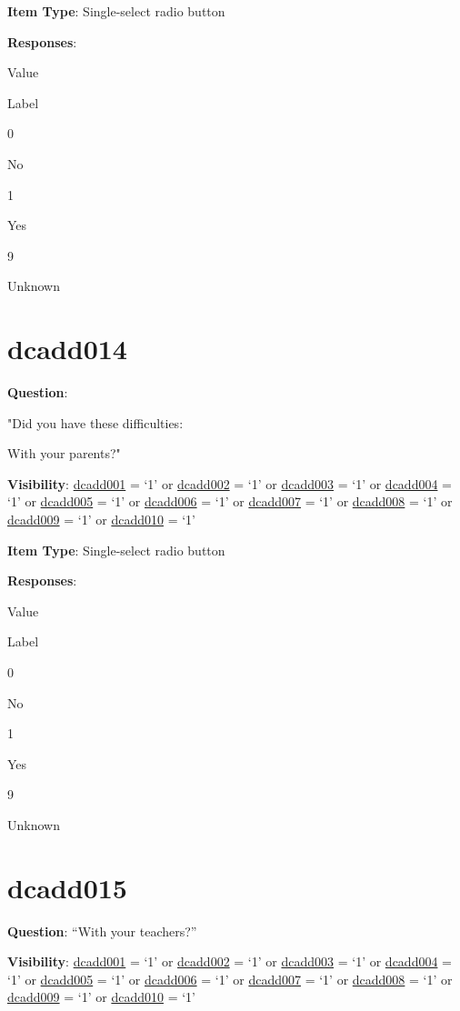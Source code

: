 \documentclass[]{book}
\begin{document}
\textbf{Item Type}: Single-select radio button

\textbf{Responses}:

Value

Label

0

No

1

Yes

9

Unknown

\hypertarget{dcadd014}{%
\section{dcadd014}\label{dcadd014}}

\textbf{Question}:

"Did you have these difficulties:

With your parents?"

\textbf{Visibility}: \protect\hyperlink{dcadd001}{dcadd001} = `1' or \protect\hyperlink{dcadd002}{dcadd002} = `1' or \protect\hyperlink{dcadd003}{dcadd003} = `1' or \protect\hyperlink{dcadd004}{dcadd004} = `1' or \protect\hyperlink{dcadd005}{dcadd005} = `1' or \protect\hyperlink{dcadd006}{dcadd006} = `1' or \protect\hyperlink{dcadd007}{dcadd007} = `1' or \protect\hyperlink{dcadd008}{dcadd008} = `1' or \protect\hyperlink{dcadd009}{dcadd009} = `1' or \protect\hyperlink{dcadd010}{dcadd010} = `1'

\textbf{Item Type}: Single-select radio button

\textbf{Responses}:

Value

Label

0

No

1

Yes

9

Unknown

\hypertarget{dcadd015}{%
\section{dcadd015}\label{dcadd015}}

\textbf{Question}: ``With your teachers?''

\textbf{Visibility}: \protect\hyperlink{dcadd001}{dcadd001} = `1' or \protect\hyperlink{dcadd002}{dcadd002} = `1' or \protect\hyperlink{dcadd003}{dcadd003} = `1' or \protect\hyperlink{dcadd004}{dcadd004} = `1' or \protect\hyperlink{dcadd005}{dcadd005} = `1' or \protect\hyperlink{dcadd006}{dcadd006} = `1' or \protect\hyperlink{dcadd007}{dcadd007} = `1' or \protect\hyperlink{dcadd008}{dcadd008} = `1' or \protect\hyperlink{dcadd009}{dcadd009} = `1' or \protect\hyperlink{dcadd010}{dcadd010} = `1'
\end{document}
